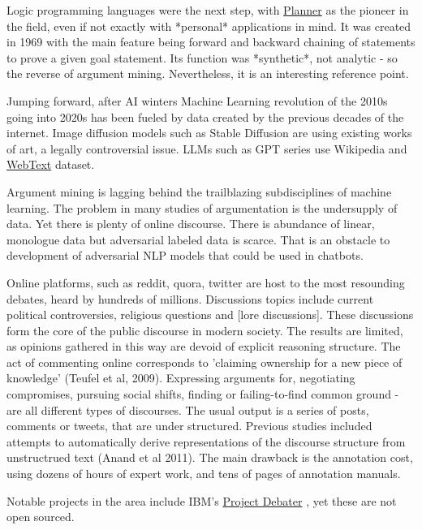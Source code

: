 \documentclass{article}
\begin{document}
Logic programming languages were the next step, with \href{https://en.wikipedia.org/wiki/Planner_(programming_language)}{Planner} as the pioneer in the field, even if not exactly with *personal* applications in mind.  It was created in 1969 with the main feature being forward and backward chaining of statements to prove a given goal statement.
Its function was *synthetic*, not analytic - so the reverse of argument mining. Nevertheless, it is an interesting reference point.

Jumping forward, after AI winters Machine Learning revolution of the 2010s going into 2020s has been fueled by data created by the previous decades of the internet. Image diffusion models such as Stable Diffusion are using existing works of art, a legally controversial issue. LLMs such as GPT series use Wikipedia and \href{https://paperswithcode.com/dataset/webtext}{WebText} dataset.

Argument mining is lagging behind the trailblazing subdisciplines of machine learning. The problem in many studies of argumentation is the undersupply of data. Yet there is plenty of online discourse.
There is abundance of linear, monologue data but adversarial labeled data is scarce. That is an obstacle to development of adversarial NLP models that could be used in chatbots. 

Online platforms, such as reddit, quora, twitter are host to the most resounding debates, heard by hundreds of millions.  Discussions topics include current political controversies, religious questions and [lore discussions]. These discussions form the core of the public discourse in modern society.  The results are limited, as opinions gathered in this way are devoid of explicit reasoning structure.  The act of commenting online corresponds to 'claiming ownership for a new piece of knowledge' (Teufel et al, 2009). Expressing arguments for, negotiating compromises, pursuing social shifts, finding or failing-to-find common ground - are all different types of discourses. The usual output is a series of posts, comments or tweets, that are under structured. 
Previous studies included attempts to automatically derive representations of the discourse structure from unstructrued text (Anand et al 2011).
The main drawback is the annotation cost, using dozens of hours of expert work, and tens of pages of annotation manuals.

Notable projects in the area include IBM's \href{https://research.ibm.com/interactive/project-debater/}{Project Debater} \cite{slonim2021autonomous}, yet these are not open sourced.
\end{document}

